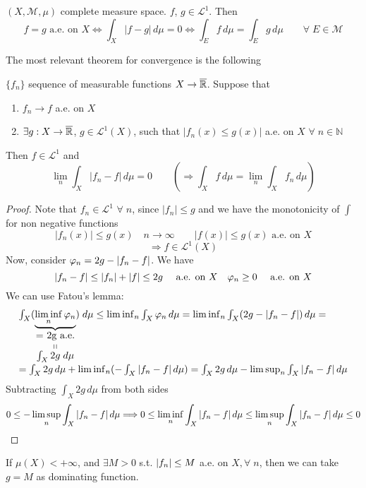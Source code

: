 \begin{theorem}
    \((X, \mathcal{M}, \mu)\) complete measure space. \(f\), \(g \in \mathcal{L}^1\). Then
    \[
        f= g \text{ a.e. on } X \iff \int_X |f-g| \, d\mu =0 \iff \int_E f \, d\mu = \int_E g \, d\mu \qquad \forall \; E \in \mathcal{M} 
    \]
\end{theorem}
The most relevant theorem for convergence is the following
\begin{theorem}
    \(\{f_n\}\) sequence of measurable functions \(X \to \overline{\mathbb{R}}\). Suppose that
    \begin{enumerate}
        \item \(f_n \to f \) a.e. on \(X\)
        \item \(\exists g : X \to \overline{\mathbb{R}} \), \(g \in \mathcal{L}^1(X)\), such that \(|f_n(x) \leq g(x)|\) a.e. on \(X\) \(\forall \; n \in \mathbb{N}\)
    \end{enumerate}
    Then \(f \in \mathcal{L}^1\) and 
    \[
        \lim_n \int_X |f_n -f| \, d\mu = 0 
        \qquad \left( \Rightarrow \int_X f \, d\mu = \lim_n \int_X f_n \, d\mu \right)  
    \]
\end{theorem}
\begin{proof}
    Note that \(f_n \in \mathcal{L}^1\) \(\forall \; n\), since \(|f_n| \leq g\) and we have the monotonicity of \(\int\) for non negative functions
    \[
        |f_n(x)| \leq g(x) \quad
        n \to \infty \qquad
        |f(x)| \leq g(x) \text{  a.e. on } X 
    \]
    \[ 
        \Rightarrow f \in \mathcal{L}^1(X)
    \]  
    Now, consider \(\oldphi_n = 2g - |f_n - f|\). We have
    \[
        |f_n-f| \leq |f_n|+|f| \leq 2g \quad \text{ a.e. on }X \quad \oldphi_n \geq 0 \quad \text{ a.e. on }X  
    \]
    We can use Fatou's lemma:
    \[\begin{array}{l}
        \int_X (\underbrace{\liminf_n \oldphi_n}_{\stackbelowlittle{\mbox{= 2g a.e.}}{\int_X 2g \; d\mu}}) \; d\mu \leq \liminf_n \int_X \oldphi_n \, d\mu = \liminf_n \int_X (2g - \abs{f_n - f}) \, d\mu = \\
        = \int_X 2g \, d\mu + \liminf_n (-\int_X \abs{f_n - f} \, d\mu) =\int_X 2g \, d\mu - \limsup_n \int_X \abs{f_n - f} \, d\mu
    \end{array}
    \]
    Subtracting \(\int_X 2g \, d\mu\) from both sides 
    \[
        0 \leq -\limsup_n \int_X \abs{f_n - f} \, d\mu \Longrightarrow 0 \leq \liminf_n \int_X \abs{f_n - f} \, d\mu \leq \limsup_n \int_X \abs{f_n - f} \, d\mu \leq 0 
    \]  
\end{proof}
\begin{remark}
    If \(\mu(X) < +\infty\), and \(\exists M > 0\) s.t. \(\abs{f_n} \leq M\) a.e. on \(X, \forall \; n\), then we can take \(g = M\) as dominating function.
\end{remark}

